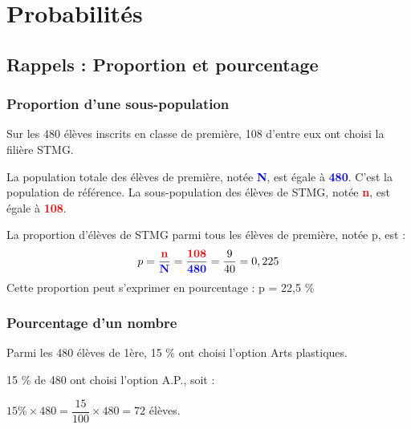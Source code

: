 \chapter{Probabilités}
\thispagestyle{fancy}

\section{Rappels : Proportion et pourcentage}

\subsection{Proportion d'une sous-population}

\begin{exemple}
	Sur les 480 élèves inscrits en classe de première, 108 d'entre eux ont choisi la filière STMG.
\end{exemple}

La population totale des élèves de première, notée \textcolor{blue}{\textbf{N}}, est égale à \textcolor{blue}{\textbf{480}}. C'est la population de référence.
La sous-population des élèves de STMG, notée \textcolor{red}{\textbf{n}}, est égale à \textcolor{red}{\textbf{108}}.

La proportion d'élèves de STMG parmi tous les élèves de première, notée p, est :
\[p= \frac{\textcolor{red}{\textbf{n}}}{\textcolor{blue}{\textbf{N}}} = \frac{\textcolor{red}{\textbf{108}}}{\textcolor{blue}{\textbf{480}}} = \frac{9}{40} = 0,225\]
Cette proportion peut s'exprimer en pourcentage : p = 22,5 \%

\subsection{Pourcentage d'un nombre}

\begin{exemple}
	Parmi les 480 élèves de 1ère, 15 \% ont choisi l'option Arts plastiques.
	
	15 \% de 480 ont choisi l'option A.P., soit :
	
	$15 \% \times 480 = \dfrac{15}{100}\times 480 = 72$ élèves.
\end{exemple}

